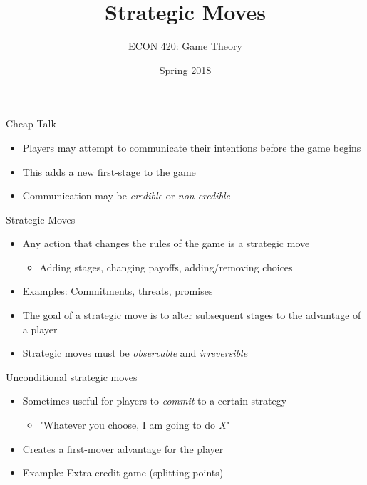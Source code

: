 \documentclass[10pt]{beamer}
\author{ECON 420: Game Theory}
\date{Spring 2018}
\title{Strategic Moves}
\begin{document}
\maketitle

\begin{frame}[label={sec:orgeb23bfc}]{}
\alert{Cheap Talk}
\begin{itemize}
\item Players may attempt to communicate their intentions before the game begins
\item This adds a new first-stage to the game
\item Communication may be \emph{credible} or \emph{non-credible}
\end{itemize}
\end{frame}

\begin{frame}[label={sec:orgcbc2439}]{}
\alert{Strategic Moves}
\begin{itemize}
\item Any action that changes the rules of the game is a strategic move
\begin{itemize}
\item Adding stages, changing payoffs, adding/removing choices
\end{itemize}
\item Examples: Commitments, threats, promises
\item The goal of a strategic move is to alter subsequent stages to the advantage of a player
\item Strategic moves must be \emph{observable} and \emph{irreversible}
\end{itemize}
\end{frame}

\begin{frame}[label={sec:org3a814a1}]{}
\alert{Unconditional strategic moves}
\begin{itemize}
\item Sometimes useful for players to \emph{commit} to a certain strategy 
\begin{itemize}
\item "Whatever you choose, I am going to do \emph{X}"
\end{itemize}
\item Creates a first-mover advantage for the player
\item Example: Extra-credit game (splitting points)
\end{itemize}
\end{frame}
\end{document}
